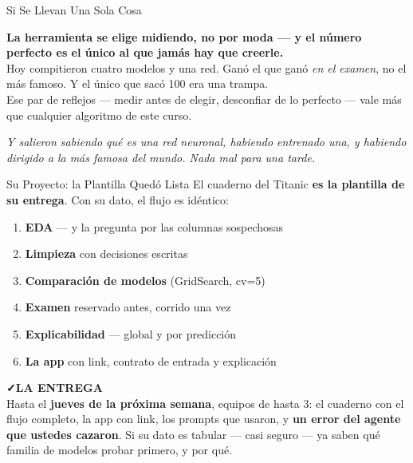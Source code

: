 \documentclass[aspectratio=169, 11pt]{beamer}
\begin{document}
\begin{frame}[shrink=5]{Si Se Llevan Una Sola Cosa}
  \vspace{6pt}
  \begin{tcolorbox}[colback=arcaGray, colframe=arcaRed, boxrule=0pt, leftrule=4pt,
    arc=3pt, left=10pt, right=10pt, top=9pt, bottom=9pt]
    {\large\color{arcaDark}\bfseries
     La herramienta se elige midiendo, no por moda --- y el número perfecto
     es el único al que jamás hay que creerle.}\\[6pt]
    {\footnotesize\color{textMuted}
     Hoy compitieron cuatro modelos y una red. Ganó el que ganó \emph{en el
     examen}, no el más famoso. Y el único que sacó 100 era una trampa.\\[5pt]
     Ese par de reflejos --- medir antes de elegir, desconfiar de lo
     perfecto --- vale más que cualquier algoritmo de este curso.}
  \end{tcolorbox}
  \vspace{7pt}
  {\footnotesize\color{arcaDark}\itshape
   Y salieron sabiendo qué es una red neuronal, habiendo entrenado una, y
   habiendo dirigido a la más famosa del mundo. Nada mal para una tarde.}
\end{frame}

\begin{frame}[shrink=5]{Su Proyecto: la Plantilla Quedó Lista}
  \vspace{2pt}
  {\scriptsize\color{textMuted}
   El cuaderno del Titanic \textbf{es la plantilla de su entrega}. Con su
   dato, el flujo es idéntico:}
  \vspace{2pt}
  {\scriptsize\color{textMuted}
  \begin{enumerate}\setlength{\itemsep}{2pt}
    \item \textbf{EDA} --- y la pregunta por las columnas sospechosas
    \item \textbf{Limpieza} con decisiones escritas
    \item \textbf{Comparación de modelos} (GridSearch, cv=5)
    \item \textbf{Examen} reservado antes, corrido una vez
    \item \textbf{Explicabilidad} --- global y por predicción
    \item \textbf{La app} con link, contrato de entrada y explicación
  \end{enumerate}}
  \vspace{2pt}
  \begin{tcolorbox}[colback=arcaGray, colframe=codeGreen, boxrule=0pt, leftrule=3pt,
    arc=3pt, left=8pt, right=8pt, top=4pt, bottom=4pt]
    {\scriptsize\color{codeGreen}\bfseries\faCheck\hspace{4pt}LA ENTREGA}\\[3pt]
    {\scriptsize\color{textMuted}
     Hasta el \textbf{jueves de la próxima semana}, equipos de hasta 3: el
     cuaderno con el flujo completo, la app con link, los prompts que
     usaron, y \textbf{un error del agente que ustedes cazaron}. Si su dato
     es tabular --- casi seguro --- ya saben qué familia de modelos probar
     primero, y por qué.}
  \end{tcolorbox}
\end{frame}
\end{document}

